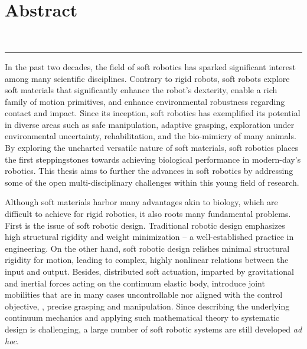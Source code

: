 \chapter*{\vspace{-50mm}\\ \huge{Abstract}} %
\vspace{-10mm}
\begin{center}
\textbf{{\large \maintitle} \\[0.05em]
}
\rule{\textwidth}{.75pt}
\end{center} 

\vspace{-2mm}
In the past two decades, the field of soft robotics has sparked significant interest among many scientific disciplines. Contrary to rigid robots, soft robots explore soft materials that significantly enhance the robot's dexterity, enable a rich family of motion primitives, and enhance environmental robustness regarding contact and impact. Since its inception, soft robotics has exemplified its potential in diverse areas such as safe manipulation, adaptive grasping, exploration under environmental uncertainty, rehabilitation, and the bio-mimicry of many animals. By exploring the uncharted versatile nature of soft materials, soft robotics places the first steppingstones towards achieving biological performance in modern-day's robotics. This thesis aims to further the advances in soft robotics by addressing some of the open multi-disciplinary challenges within this young field of research. 

Although soft materials harbor many advantages akin to biology, which are difficult to achieve for rigid robotics, it also roots many fundamental problems. First is the issue of soft robotic design. Traditional robotic design emphasizes high structural rigidity and weight minimization -- a well-established practice in engineering. On the other hand, soft robotic design relishes minimal structural rigidity for motion, leading to complex, highly nonlinear relations between the input and output. Besides, distributed soft actuation, imparted by gravitational and inertial forces acting on the continuum elastic body, introduce joint mobilities that are in many cases uncontrollable nor aligned with the control objective, \eg, precise grasping and manipulation. Since describing the underlying continuum mechanics and applying such mathematical theory to systematic design is challenging, a large number of soft robotic systems are still developed \textit{ad hoc}. 

